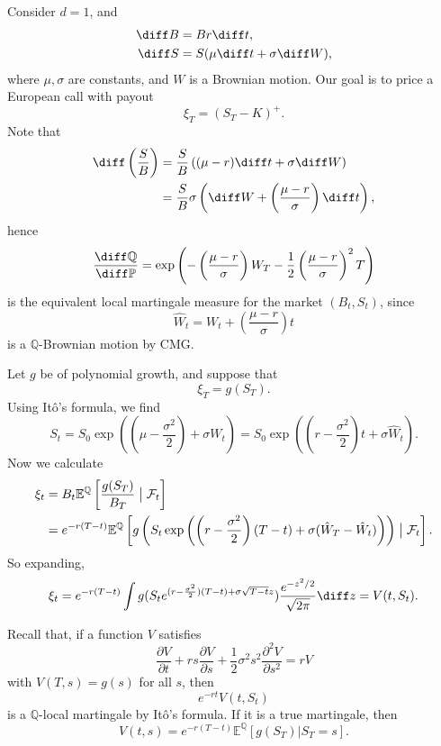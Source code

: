 \documentclass[12pt]{article}
\begin{document}
\begin{exbox}
	Consider $d = 1$, and
	\begin{align*}
		\diff B &= B r \diff t, \\
		\diff S &= S (\mu \diff t + \sigma \diff W),
	\end{align*}
	where $\mu, \sigma$ are constants, and $W$ is a Brownian motion. Our goal is to price a European call with payout
	\[
	\xi_T = (S_T - K)^{+}.
	\]
	Note that
	\begin{align*}
		\diff \left( \frac{S}{B} \right) &= \frac{S}{B} \left( (\mu - r) \diff t + \sigma \diff W \right) \\
						 &= \frac{S}{B} \sigma \left( \diff W +  \left( \frac{\mu - r}{\sigma} \right) \diff t \right),
	\end{align*}
	hence
	\[
	\frac{\diff \mathbb{Q}}{\diff \mathbb{P}} = \exp \left( - \left( \frac{\mu- r}{\sigma} \right) W_T - \frac 12 \left( \frac{\mu - r}{\sigma} \right)^2 T \right)
	\]
	is the equivalent local martingale measure for the market $(B_t, S_t)$, since
	\[
	\hat W_t = W_t + \left( \frac{\mu - r}{\sigma} \right) t
	\]
	is a $\mathbb{Q}$-Brownian motion by CMG.

	Let $g$ be of polynomial growth, and suppose that
	\[
	\xi_T = g(S_T).
	\]
	Using It\^o's formula, we find
	\[
	S_t = S_0 \exp \left( \left(\mu - \frac{\sigma^2}{2} \right)  + \sigma W_t \right) = S_0 \exp \left( \left( r - \frac{\sigma^2}{2} \right) t + \sigma \hat W_t \right).
	\]
	Now we calculate
	\begin{align*}
		\xi_t &= B_t \mathbb{E}^{\mathbb{Q}}\left[ \frac{g(S_T)}{B_T} \bigm| \mathcal{F}_t \right] \\
		      &= e^{-r(T - t)} \mathbb{E}^{\mathbb{Q}}\left[g\left(S_t \exp \left( \left(r - \frac{\sigma^2}{2} \right)(T - t) + \sigma(\hat W_T - \hat W_t) \right) \right) \bigm| \mathcal{F}_t\right].
	\end{align*}
	So expanding,
	\[
		\xi_t = e^{-r (T - t)} \int g(S_t e^{(r - \frac{\sigma^2}{2})(T - t) + \sigma\sqrt{T - t} z}) \frac{e^{-z^2/2}}{\sqrt{2\pi}} \diff z = V(t, S_t).
	\]
\end{exbox}

Recall that, if a function $V$ satisfies
\[
\frac{\partial V}{\partial t} + r s \frac{\partial V}{\partial s} + \frac 12 \sigma^2 s^2 \frac{\partial^2 V}{\partial s^2} = r V
\]
with $V(T, s) = g(s)$ for all $s$, then
\[
e^{-rt}V(t, S_t)
\]
is a $\mathbb{Q}$-local martingale by It\^o's formula. If it is a true martingale, then
\[
V(t, s) = e^{-r(T - t)} \mathbb{E}^{\mathbb{Q}}[g(S_T) | S_T = s].
\]


\newpage

\printindex
\end{document}
